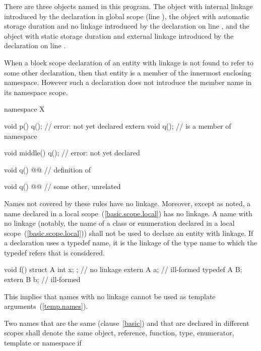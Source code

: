There are three objects named  in this program. The object with
internal linkage introduced by the declaration in global scope (line
), the object with automatic storage duration and no linkage
introduced by the declaration on line , and the object with
static storage duration and external linkage introduced by the
declaration on line . \exitexample

\pnum
When a block scope declaration of an entity with linkage is not found to
refer to some other declaration, then that entity is a member of the
innermost enclosing namespace. However such a declaration does not
introduce the member name in its namespace scope. \enterexample

\begin{codeblock}
namespace X {
	void p()
	{
		q();                    // error:  not yet declared
		extern void q();        //  is a member of namespace 
	}

	void middle()
	{
		q();                    // error:  not yet declared
	}

	void q() @@         // definition of         
}

void q() @@		  // some other, unrelated 
\end{codeblock}
\exitexampleb

\pnum
{}%
Names not covered by these rules have no linkage. Moreover, except as
noted, a name declared in a local scope~(\ref{basic.scope.local}) has no
linkage. A name with no linkage (notably, the name of a class or
enumeration declared in a local scope~(\ref{basic.scope.local})) shall
not be used to declare an entity with linkage. If a declaration uses
a typedef name, it is the linkage of the type name to which the typedef
refers that is considered. \enterexample

\begin{codeblock}
void f()
{
    struct A { int x; };	// no linkage
    extern A a;			// ill-formed
    typedef A B;
    extern B b;			// ill-formed
}
\end{codeblock}

\exitexampleb This implies that names with no linkage cannot be used
as template arguments~(\ref{temp.names}).

\pnum
Two names that are the same (clause~\ref{basic}) and that are declared
in different scopes shall denote the same object, reference, function,
type, enumerator, template or namespace if

